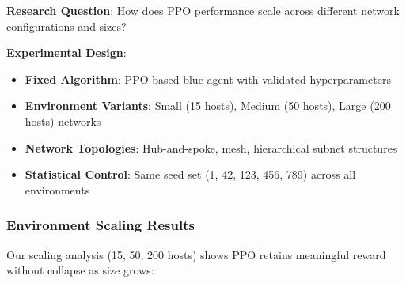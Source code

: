 \documentclass[12pt,oneside]{article}
\begin{document}
\textbf{Research Question}: How does PPO performance scale across different network configurations and sizes?

\textbf{Experimental Design}:
\begin{itemize}
\item \textbf{Fixed Algorithm}: PPO-based blue agent with validated hyperparameters
\item \textbf{Environment Variants}: Small (15 hosts), Medium (50 hosts), Large (200 hosts) networks
\item \textbf{Network Topologies}: Hub-and-spoke, mesh, hierarchical subnet structures
\item \textbf{Statistical Control}: Same seed set (1, 42, 123, 456, 789) across all environments
\end{itemize}

\subsubsection{Environment Scaling Results}

Our scaling analysis (15, 50, 200 hosts) shows PPO retains meaningful reward without collapse as size grows:
\end{document}
